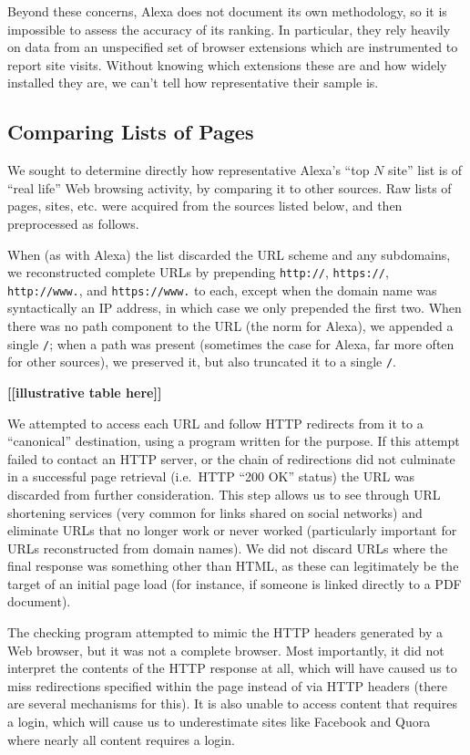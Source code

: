 \documentclass[tinymargin]{zarticle}
\def\todo#1{{\color{todocolor}\bfseries [#1]}}
\begin{document}
Beyond these concerns, Alexa does not document its own methodology, so
it is impossible to assess the accuracy of its ranking.  In
particular, they rely heavily on data from an unspecified set of
browser extensions which are instrumented to report site visits.
Without knowing which extensions these are and how widely installed
they are, we can't tell how representative their sample is.

\subsection{Comparing Lists of Pages}

We sought to determine directly how representative Alexa's “top $N$
site” list is of “real life” Web browsing activity, by comparing it to
other sources.  Raw lists of pages, sites, etc. were acquired from the
sources listed below, and then preprocessed as follows.

When (as with Alexa) the list discarded the URL scheme and any
subdomains, we reconstructed complete URLs by prepending
\verb|http://|, \verb|https://|, \verb|http://www.|, and
\verb|https://www.| to each, except when the domain name was
syntactically an IP address, in which case we only prepended the first
two.  When there was no path component to the URL (the norm for
Alexa), we appended a single \verb|/|; when a path was present
(sometimes the case for Alexa, far more often for other sources), we
preserved it, but also truncated it to a single \verb|/|.

\todo{[illustrative table here]}

We attempted to access each URL and follow HTTP redirects from it to a
“canonical” destination, using a program written for the purpose.  If
this attempt failed to contact an HTTP server, or the chain of
redirections did not culminate in a successful page retrieval
(i.e.\ HTTP “200 OK” status) the URL was discarded from further
consideration.  This step allows us to see through URL shortening
services (very common for links shared on social networks) and
eliminate URLs that no longer work or never worked (particularly
important for URLs reconstructed from domain names).  We did not
discard URLs where the final response was something other than HTML,
as these can legitimately be the target of an initial page load (for
instance, if someone is linked directly to a PDF document).

The checking program attempted to mimic the HTTP headers generated by
a Web browser, but it was not a complete browser.  Most importantly,
it did not interpret the contents of the HTTP response at all, which
will have caused us to miss redirections specified within the page
instead of via HTTP headers (there are several mechanisms for this).
It is also unable to access content that requires a login, which will
cause us to underestimate sites like Facebook and Quora where nearly
all content requires a login.
\end{document}
